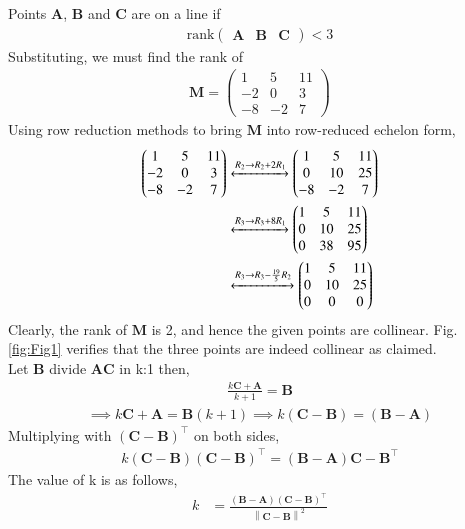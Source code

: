 \documentclass[12pt]{article}
\let\vec\mathbf
\providecommand{\brak}[1]{\ensuremath{\left(#1\right)}}
\providecommand{\norm}[1]{\left\lVert#1\right\rVert}
\newcommand{\myvec}[1]{\ensuremath{\begin{pmatrix}#1\end{pmatrix}}}
\let\vec\mathbf
\begin{document}
\begin{enumerate}
		Points $\vec{A}$, $\vec{B}$ and $\vec{C}$ are on a line if
    \begin{align}
        \textrm{rank}\myvec{\vec{A} & \vec{B} & \vec{C}} < 3
        \label{eq:chapters/12/10/5/8rank-collinear}
    \end{align}
    Substituting, we must find the rank of
    \begin{align}
        \vec{M} = \myvec{1&5&11\\-2&0&3\\-8&-2&7}
    \end{align}
    Using row reduction methods to bring $\vec{M}$ into row-reduced echelon form,
    \begin{align}
        \myvec{1&5&11\\-2&0&3\\-8&-2&7}&\xleftrightarrow[]{R_2\rightarrow R_2+2R_1}
        \myvec{1&5&11\\0&10&25\\-8&-2&7} \\
                &\xleftrightarrow[]{R_3\rightarrow R_3+8R_1}\myvec{1&5&11\\0&10&25\\0&38&95} \\
                &\xleftrightarrow[]{R_3\rightarrow R_3-\frac{19}{5}R_2}\myvec{1&5&11\\0&10&25\\0&0&0}
                \label{eq:chapters/12/10/5/8row-red}
    \end{align}
    Clearly, the rank of $\vec{M}$ is 2, and hence the given points are 
    collinear. 
    Fig. \ref{fig:Fig1}  verifies that the three points are indeed 
    collinear as claimed.\\
	Let $\vec{B}$ divide $\vec{AC}$ in k:1 then,
	\begin{align}
		\frac{k\vec{C}+\vec{A}}{k+1} = \vec{B}
	\end{align}
		\begin{align}
			\implies k\vec{C}+\vec{A}=\vec{B}\brak{k+1}
			\implies k\brak{\vec{C}-\vec{B}}=\brak{\vec{B}-\vec{A}}
		\end{align}
			Multiplying with $\brak{\vec{C}-\vec{B}}^{\top}$ on both sides,\\
	
		\begin{align*}
			 k\brak{\vec{C}-\vec{B}}\brak{\vec{C}-\vec{B}}^{\top}=\brak{\vec{B}-\vec{A}}{\vec{C}-\vec{B}}^{\top}
		\end{align*}
			The value of k is as follows,
			\begin{align}
			k &=
			\frac{\brak{\vec{B}-\vec{A}}\brak{\vec{C}-\vec{B}}^{\top}}{\norm{\vec{C-B}}^2}
			\label{eq:7}
			\end{align}


\end{enumerate}
\end{document}
